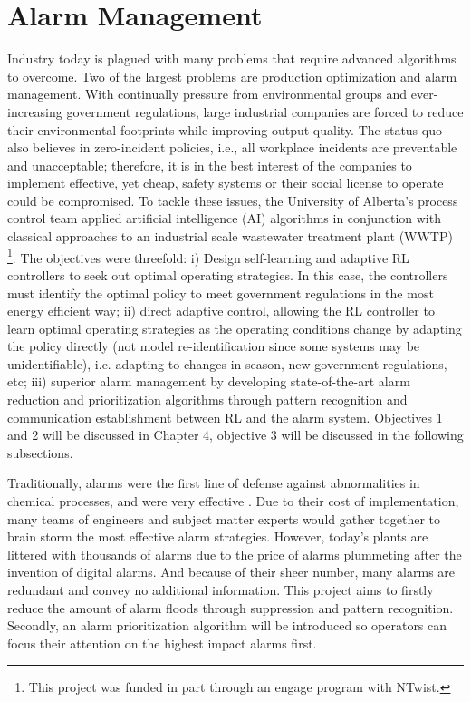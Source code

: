 \section{Alarm Management}
Industry today is plagued with many problems that require advanced algorithms to overcome. Two of the largest problems are production optimization and alarm management. With continually pressure from environmental groups and ever-increasing government regulations, large industrial companies are forced to reduce their environmental footprints while improving output quality. The status quo also believes in zero-incident policies, i.e., all workplace incidents are preventable and unacceptable; therefore, it is in the best interest of the companies to implement effective, yet cheap, safety systems or their social license to operate could be compromised. To tackle these issues, the University of Alberta's process control team applied artificial intelligence (AI) algorithms in conjunction with classical approaches to an industrial scale wastewater treatment plant (WWTP) \footnote{This project was funded in part through an engage program with NTwist.}. The objectives were threefold: i) Design self-learning and adaptive RL controllers to seek out optimal operating strategies. In this case, the controllers must identify the optimal policy to meet government regulations in the most energy efficient way; ii) direct adaptive control, allowing the RL controller to learn optimal operating strategies as the operating conditions change by adapting the policy directly (not model re-identification since some systems may be unidentifiable), i.e. adapting to changes in season, new government regulations, etc; iii) superior alarm management by developing state-of-the-art alarm reduction and prioritization algorithms through pattern recognition and communication establishment between RL and the alarm system. Objectives 1 and 2 will be discussed in Chapter 4, objective 3 will be discussed in the following subsections.

Traditionally, alarms were the first line of defense against abnormalities in chemical processes, and were very effective \cite{alarm_manage}. Due to their cost of implementation, many teams of engineers and subject matter experts would gather together to brain storm the most effective alarm strategies. However, today's plants are littered with thousands of alarms due to the price of alarms plummeting after the invention of digital alarms. And because of their sheer number, many alarms are redundant and convey no additional information. 
This project aims to firstly reduce the amount of alarm floods through suppression and pattern recognition. Secondly, an alarm prioritization algorithm will be introduced so operators can focus their attention on the highest impact alarms first.

